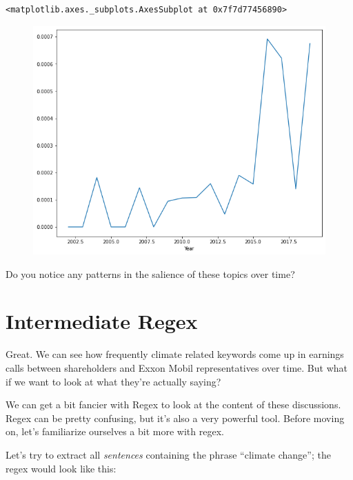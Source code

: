 \documentclass[
  letterpaper,
  DIV=11,
  numbers=noendperiod]{scrreprt}
\begin{document}
\begin{verbatim}
<matplotlib.axes._subplots.AxesSubplot at 0x7f7d77456890>
\end{verbatim}

\begin{figure}[H]

{\centering \includegraphics{notebooks/W04. Natural Language Processing_files/figure-pdf/cell-15-output-2.png}

}

\end{figure}

Do you notice any patterns in the salience of these topics over time?

\hypertarget{intermediate-regex}{%
\section{Intermediate Regex}\label{intermediate-regex}}

Great. We can see how frequently climate related keywords come up in
earnings calls between shareholders and Exxon Mobil representatives over
time. But what if we want to look at what they're actually saying?

We can get a bit fancier with Regex to look at the content of these
discussions. Regex can be pretty confusing, but it's also a very
powerful tool. Before moving on, let's familiarize ourselves a bit more
with regex.

Let's try to extract all \emph{sentences} containing the phrase
``climate change''; the regex would look like this:
\end{document}
